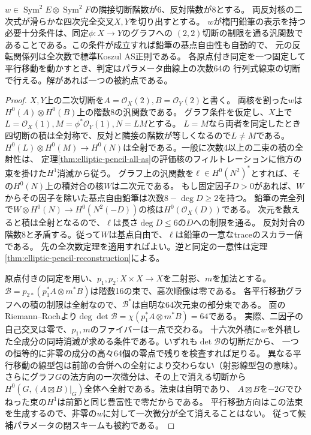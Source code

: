 \begin{theorem}[滑らかな反対核とグラフによる逆判定]\label{thm:smooth-apolar-graph-test}
$w\in\operatorname{Sym}^2 E\otimes\operatorname{Sym}^2 F$の隣接切断階数が6、反対階数が8とする。
両反対核の二次式が滑らかな四次完全交叉$X,Y$を切り出すとする。
$w$が楕円鉛筆の表示を持つ必要十分条件は、同定$\phi:X\to Y$のグラフへの
$(2,2)$切断の制限を通る汎関数であることである。この条件が成立すれば鉛筆の基点自由性も自動的で、
元の反転関係列は全次数で標準Koszul AS正則である。
各原点付き同定を一つ固定して平行移動を動かすとき、判定はパラメータ曲線上の次数64の
行列式線束の切断で行える。解があれば一つの被約点である。
\end{theorem}
\begin{proof}
$X,Y$上の二次切断を$A=\mathcal O_X(2),B=\mathcal O_Y(2)$と書く。
両核を割った$w$は$H^0(A)\otimes H^0(B)$上の階数8の汎関数である。
グラフ条件を仮定し、$X$上で$L=\mathcal O_X(1), M=\phi^*\mathcal O_Y(1), N=LM$とする。
$L=M$なら両者を同定したとき四切断の積は全対称で、反対と隣接の階数が等しくなるので$L\ne M$である。
$H^0(L)\otimes H^0(M)\to H^0(N)$は全射である。一般に次数4以上の二束の積の全射性は、
定理\ref{thm:elliptic-pencil-all-as}の評価核のフィルトレーションに他方の束を掛けた$H^1$消滅から従う。
グラフ上の汎関数を$\ell\in H^0(N^2)^*$とすれば、その$H^0(N)$上の積対合の核$W$は二次元である。
もし固定因子$D>0$があれば、$W$からその因子を除いた基点自由鉛筆は次数$8-\deg D\ge2$を持つ。
鉛筆の完全列で$W\otimes H^0(N)\to H^0(N^2(-D))$の核は$H^0(\mathcal O_X(D))$である。
次元を数えると積は全射となるので、$\ell$は長さ$\deg D\le6$の$D$への制限を通る。
反対対合の階数8と矛盾する。従って$W$は基点自由で、$\ell$は鉛筆の一意なtraceのスカラー倍である。
先の全次数定理を適用すればよい。逆と同定の一意性は定理\ref{thm:elliptic-pencil-reconstruction}による。

原点付きの同定を用い、$p_1,p_2:X\times X\to X$を二射影、$m$を加法とする。
$\mathcal B=p_{2*}(p_1^*A\otimes m^*B)$は階数16の束で、高次順像は零である。
各平行移動グラフへの積の制限は全射なので、$\mathcal B^*$は自明な64次元束の部分束である。
面のRiemann--Rochより$\deg\det\mathcal B=\chi(p_1^*A\otimes m^*B)=64$である。
実際、二因子の自己交叉は零で、$p_1,m$のファイバーは一点で交わる。
十六次外積に$w$を外積した全成分の同時消滅が求める条件である。いずれも$\det\mathcal B$の切断だから、
一つの恒等的に非零の成分の高々64個の零点で残りを検査すれば足りる。
異なる平行移動の線型包は前節の合併への全射により交わらない（射影線型包の意味）。
さらにグラフ$G$の法方向の一次微分は、その上で消える切断から
$H^0(G,(A\boxtimes B)|_G)$全体へ全射である。法束は自明であり、
$A\boxtimes B$を$-2G$でひねった束の$H^1$は前節と同じ豊富性で零だからである。
平行移動方向はこの法束を生成するので、非零の$w$に対して一次微分が全て消えることはない。
従って候補パラメータの閉スキームも被約である。
\end{proof}

